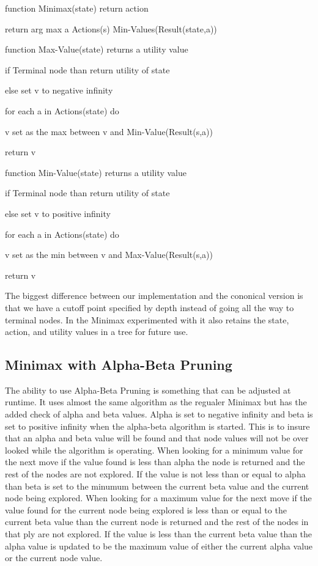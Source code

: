 \documentclass[12pt,letterpaper]{article}
\begin{document}
function Minimax(state) return action

return arg max a \in Actions(s) Min-Values(Result(state,a)) \newline

function Max-Value(state) returns a utility value

if Terminal node than return utility of state

else set v to negative infinity

for each a in Actions(state) do

v set as the max between v and Min-Value(Result(s,a))

return v \newline

function Min-Value(state) returns a utility value

if Terminal node than return utility of state

else set v to positive infinity

for each a in Actions(state) do

v set as the min between v and Max-Value(Result(s,a))

return v \newline

The biggest difference between our implementation and the cononical version is that we have a cutoff point specified by depth instead of going all the way to terminal nodes. In the Minimax experimented with it also retains the state, action, and utility values in a tree for future use.
 

\subsection{Minimax with Alpha-Beta Pruning}
 The ability to use Alpha-Beta Pruning is something that can be adjusted at runtime. It uses almost the same algorithm as the regualer Minimax but has the added check of alpha and beta values. Alpha is set to negative infinity and beta is set to positive infinity when the alpha-beta algorithm is started. This is to insure that an alpha and beta value will be found and that node values will not be over looked while the algorithm is operating. When looking for a minimum value for the next move if the value found is less than alpha the node is returned and the rest of the nodes are not explored. If the value is not less than or equal to alpha than beta is set to the minumum between the current beta value and the current node being explored. When looking for a maximum value for the next move if the value found for the current node being explored is less than or equal to the current beta value than the current node is returned and the rest of the nodes in that ply are not explored. If the value is less than the current beta value than the alpha value is updated to be the maximum value of either the current alpha value or the current node value. 
\end{document}
